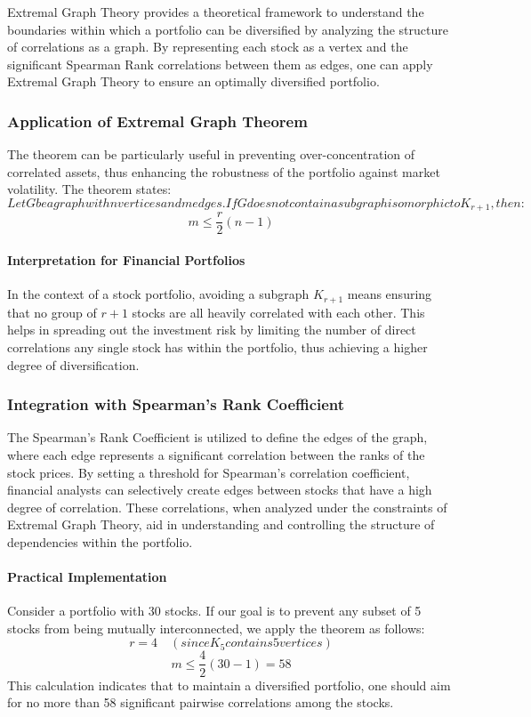 \documentclass{article}
\begin{document}
Extremal Graph Theory provides a theoretical framework to understand the boundaries within which a portfolio can be diversified by analyzing the structure of correlations as a graph. By representing each stock as a vertex and the significant Spearman Rank correlations between them as edges, one can apply Extremal Graph Theory to ensure an optimally diversified portfolio.

\subsubsection{Application of Extremal Graph Theorem}

The theorem can be particularly useful in preventing over-concentration of correlated assets, thus enhancing the robustness of the portfolio against market volatility. The theorem states:
\[
{Let } G { be a graph with } n { vertices and } m { edges. If } G { does not contain a subgraph isomorphic to } K_{r+1}, { then: }
\]
\[
m \leq \frac{r}{2} (n-1)
\]

\paragraph{Interpretation for Financial Portfolios}
In the context of a stock portfolio, avoiding a subgraph $K_{r+1}$ means ensuring that no group of $r+1$ stocks are all heavily correlated with each other. This helps in spreading out the investment risk by limiting the number of direct correlations any single stock has within the portfolio, thus achieving a higher degree of diversification.

\subsubsection{Integration with Spearman's Rank Coefficient}

The Spearman's Rank Coefficient is utilized to define the edges of the graph, where each edge represents a significant correlation between the ranks of the stock prices. By setting a threshold for Spearman's correlation coefficient, financial analysts can selectively create edges between stocks that have a high degree of correlation. These correlations, when analyzed under the constraints of Extremal Graph Theory, aid in understanding and controlling the structure of dependencies within the portfolio.

\paragraph{Practical Implementation}
Consider a portfolio with 30 stocks. If our goal is to prevent any subset of 5 stocks from being mutually interconnected, we apply the theorem as follows:
\[
r = 4 \quad ({since } K_5 {contains 5 vertices})
\]
\[
m \leq \frac{4}{2} (30-1) = 58
\]
This calculation indicates that to maintain a diversified portfolio, one should aim for no more than 58 significant pairwise correlations among the stocks.
\end{document}
